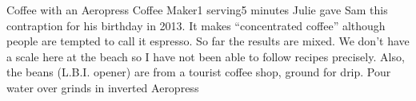 \begin{recipe}{Coffee with an Aeropress\tm{} Coffee Maker}{1 serving}{5 minutes}
\freeform Julie gave Sam this contraption for his birthday in 2013.
It makes ``concentrated coffee'' although people are tempted to call
it espresso.  So far the results are mixed.  We don't have a scale
here at the beach so I have not been able to follow recipes precisely.
Also, the beans (L.B.I. opener) are from a tourist coffee shop, ground
for drip.
 Pour water over grinds in inverted Aeropress\tm{}
\end{recipe}
